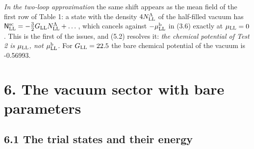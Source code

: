 \documentclass[
  10pt,
]{article}
\begin{document}
\emph{In the two-loop approximation} the same shift appears as the mean
field of the first row of Table 1: a state with the density
\(4N^\Lambda_{\rm LL}\) of the half-filled vacuum has
\(\mathsf N^{\rm sc}_{\rm LL}=-\tfrac32G_{\rm LL}N^\Lambda_{\rm LL}+\dots\),
which cancels against \(-\mu^{\rm b}_{\rm LL}\) in (3.6) exactly at
\(\mu_{\rm LL}=0\). This is the first of the issues, and (5.2) resolves
it: \emph{the chemical potential of Test 2 is \(\mu_{\rm LL}\), not
\(\mu^{\rm b}_{\rm LL}\).} For \(G_{\rm LL}=22.5\) the bare chemical
potential of the vacuum is -0.56993.

\hypertarget{the-vacuum-sector-with-bare-parameters}{%
\section{6. The vacuum sector with bare
parameters}\label{the-vacuum-sector-with-bare-parameters}}

\hypertarget{the-trial-states-and-their-energy}{%
\subsection{6.1 The trial states and their
energy}\label{the-trial-states-and-their-energy}}
\end{document}
